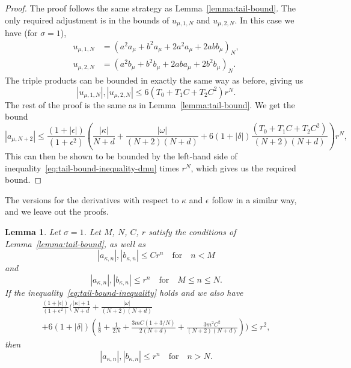\documentclass[11pt]{article}
\newtheorem{lemma}[definition]{Lemma}
\begin{document}
\begin{proof}
  The proof follows the same strategy as Lemma~\ref{lemma:tail-bound}.
  The only required adjustment is in the bounds of \(u_{\mu,1,N}\) and
  \(u_{\mu,2,N}\). In this case we have (for \(\sigma = 1\)),
  \begin{align*}
    u_{\mu,1,N} &= (a^{2}a_{\mu} + b^{2}a_{\mu} + 2a^{2}a_{\mu} + 2abb_{\mu})_{N},\\
    u_{\mu,2,N} &= (a^{2}b_{\mu} + b^{2}b_{\mu} + 2aba_{\mu} + 2b^{2}b_{\mu})_{N}.
  \end{align*}
  The triple products can be bounded in exactly the same way as
  before, giving us
  \begin{equation*}
    |u_{\mu,1,N}|, |u_{\mu,2,N}| \leq 6(T_{0} + T_{1}C + T_{2}C^{2})r^{N}.
  \end{equation*}
  The rest of the proof is the same as in
  Lemma~\ref{lemma:tail-bound}. We get the bound
  \begin{equation*}
    |a_{\mu,N + 2}|
    \leq \frac{(1 + |\epsilon|)}{(1 + \epsilon^{2})}\left(
      \frac{|\kappa|}{N + d}
      + \frac{|\omega|}{(N + 2)(N + d)}
      + 6(1 + |\delta|)\frac{(T_{0} + T_{1}C + T_{2}C^{2})}{(N + 2)(N + d)}
    \right)r^{N},
  \end{equation*}
  This can then be shown to be bounded by the left-hand side of
  inequality~\eqref{eq:tail-bound-inequality-dmu} times \(r^{N}\),
  which gives us the required bound.
\end{proof}

The versions for the derivatives with respect to \(\kappa\) and
\(\epsilon\) follow in a similar way, and we leave out the proofs.

\begin{lemma}\label{lemma:tail-bound-dkappa}
  Let \(\sigma = 1\). Let \(M\), \(N\), \(C\), \(r\) satisfy the
  conditions of Lemma~\ref{lemma:tail-bound}, as well as
  \begin{equation*}
    |a_{\kappa,n}|, |b_{\kappa,n}| \leq C r^{n} \quad\text{for}\quad n < M
  \end{equation*}
  and
  \begin{equation*}
    |a_{\kappa,n}|, |b_{\kappa,n}| \leq r^{n} \quad\text{for}\quad M \leq n \leq N.
  \end{equation*}
  If the inequality~\eqref{eq:tail-bound-inequality} holds and we also
  have
  \begin{multline}
    \label{eq:tail-bound-inequality-dkappa}
    \frac{(1 + |\epsilon|)}{(1 + \epsilon^{2})}\Bigg(
      \frac{|\kappa| + 1}{N + d}
      + \frac{|\omega|}{(N + 2)(N + d)}\\
      + 6(1 + |\delta|)\left(
        \frac{1}{8} + \frac{1}{2N}
        + \frac{3mC(1 + 3/N)}{2(N + d)}
        + \frac{3m^{2}C^{2}}{(N + 2)(N + d)}
      \right)
    \Bigg) \leq r^2,
  \end{multline}
  then
  \begin{equation*}
    |a_{\kappa,n}|, |b_{\kappa,n}| \leq r^{n} \quad\text{for}\quad n > N.
  \end{equation*}
\end{lemma}
\end{document}
